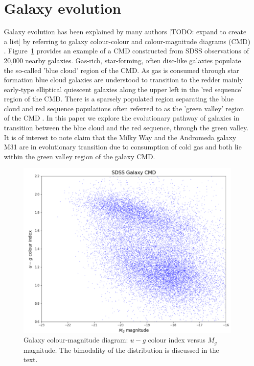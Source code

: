 \section{Galaxy evolution}
\label{sec:evolution}

Galaxy evolution has been explained by many authors [TODO: expand to create a list] \citep{baldry2004quantifying,2006MNRAS.373..469B} by referring to galaxy colour-colour and colour-magnitude diagrams (CMD) \citep[see e.g.][]{2001AJ....122.1861S, 2003ApJ...585L...5H, 2003ApJS..149..289B}. Figure~\ref{fig:CMD1} provides an example of a CMD constructed from SDSS observations of 20,000 nearby galaxies. Gas-rich, star-forming, often disc-like galaxies populate the so-called 'blue cloud' region of the CMD. As gas is consumed through star formation blue cloud galaxies are understood to transition to the redder mainly early-type elliptical quiescent galaxies along the upper left in the 'red sequence' region of the CMD. There is a sparsely populated region separating the blue cloud and red sequence populations often referred to as the 'green valley' region of the CMD  \citep{2004ApJ...608..752B}. In this paper we explore the evolutionary pathway of galaxies in transition between the blue cloud and the red sequence, through the green valley.
It is of interest to note \citet{Mutch_2011} claim that the Milky Way and the Andromeda galaxy M31 are in evolutionary transition due to consumption of cold gas and both lie within the green valley region of the galaxy CMD.

\begin{figure}
	\includegraphics[width=\columnwidth]{images/CMDs/galaxyCMD.PNG}
    \caption{Galaxy colour-magnitude diagram: $u-g$ colour index versus $M_g$ magnitude. The bimodality of the distribution is discussed in the text.}
    \label{fig:CMD1}
\end{figure}